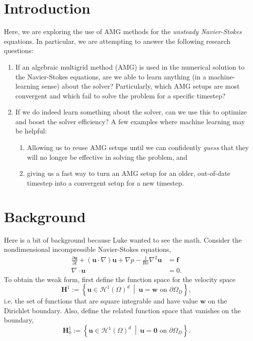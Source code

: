 \documentclass{article}
\newcommand{\mat}[1]{\bm{{#1}}}
\renewcommand{\vec}[1]{\bm{{#1}}}
\newcommand{\grad}{\nabla}
\newcommand{\setbar}{\:\middle|\:}
\renewcommand{\div}{\grad \cdot}
\renewcommand{\Re}{\text{Re}}
\begin{document}
\section{Introduction}
Here, we are exploring the use of AMG methods for the \textit{unsteady Navier-Stokes} equations.  In particular, we are attempting to answer the following research questions:
\begin{enumerate}
\item If an algebraic multigrid method (AMG) is used in the numerical solution to the Navier-Stokes equations, are we able to learn anything (in a machine-learning sense) about the solver?  Particularly, which AMG setups are most convergent and which fail to solve the problem for a specific timestep?
\item If we do indeed learn something about the solver, can we use this to optimize and boost the solver efficiency?  A few examples where machine learning may be helpful:
  \begin{enumerate}
  \item Allowing us to reuse AMG setups until we can confidently \textit{guess} that they will no longer be effective in solving the problem, and
  \item giving us a fast way to turn an AMG setup for an older, out-of-date timestep into a convergent setup for a new timestep.
  \end{enumerate}
\end{enumerate}

\section{Background}

Here is a bit of background because Luke wanted to see the math.  Consider the nondimensional incompressible Navier-Stokes equations,
\begin{align}
  \frac{\partial \vec{u}}{\partial t} + \left(\vec{u} \cdot \grad\right)\vec{u} + \grad p - \frac{1}{\Re} \grad^2\vec{u} &= \vec{f} \label{eqn:nsmomentum} \\
  \div \vec{u} &= 0. \label{eqn:nsdiv}
\end{align}
To obtain the weak form, first define the function space for the velocity space
\begin{equation}
  \mat{H}^1 := \left\{ \vec{u} \in \mathcal{H}^{1}\left(\Omega\right)^d \setbar \vec{u} = \vec{w} \text{ on } \partial \Omega_D \right\}, \label{eqn:h1}
\end{equation}
i.e. the set of functions that are square integrable and have value $\vec{w}$ on the Dirichlet boundary.  Also, define the related function space that vanishes on the boundary,
\begin{equation}
  \mat{H}^1_0 := \left\{ \vec{u} \in \mathcal{H}^{1}\left(\Omega\right)^d \setbar \vec{u} = \vec{0} \text{ on } \partial \Omega_D \right\}. \label{eqn:h10}
\end{equation}
\end{document}
